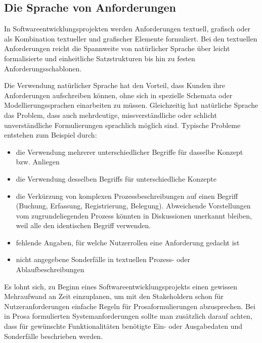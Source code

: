 \subsection{Die Sprache von Anforderungen}
\label{sec:Kap-6.2.3}

\vspace{2mm} %

In Softwareentwicklungsprojekten werden Anforderungen textuell, grafisch oder als Kombination textueller und grafischer Elemente formuliert. Bei den textuellen Anforderungen reicht die Spannweite von natürlicher Sprache über leicht formalisierte und einheitliche Satzstrukturen bis hin zu festen Anforderungsschablonen.

\vspace{2mm} %


Die Verwendung natürlicher Sprache hat den Vorteil, dass Kunden ihre Anforderungen aufschreiben können, ohne sich in spezielle Schemata oder Modellierungs\-sprachen einarbeiten zu müssen. Gleichzeitig hat natürliche Sprache das Problem, dass auch mehrdeutige, missverständliche oder schlicht unverständliche Formulierungen sprachlich möglich sind. Typische Probleme entstehen zum Beispiel durch:

\begin{itemize}
	\item die Verwendung mehrerer unterschiedlicher Begriffe für dasselbe Konzept bzw. Anliegen
	\item die Verwendung desselben Begriffs für unterschiedliche Konzepte
	\item die Verkürzung von komplexen Prozessbeschreibungen auf einen Begriff (\zb Buchung, Erfassung, Registrierung, Belegung). Abweichende Vorstellungen \linebreak %
		vom zugrundeliegenden Prozess könnten in Diskussionen unerkannt bleiben, weil alle den identischen Begriff verwenden.
	\item fehlende Angaben, für welche Nutzerrollen eine Anforderung gedacht ist
	\item nicht angegebene Sonderfälle in textuellen Prozess- oder Ablaufbeschreibungen
\end{itemize}

\vspace{2mm} %

Es lohnt sich, zu Beginn eines Softwareentwicklungsprojekts einen gewissen Mehraufwand an Zeit einzuplanen, um mit den Stakeholdern schon für Nutzeranforderungen einfache Regeln für Prosaformulierungen abzusprechen. Bei in Prosa formulierten Systemanforderungen sollte man zusätzlich darauf achten, dass für gewünschte Funktionalitäten benötigte Ein- oder Ausgabedaten und Sonderfälle beschrieben werden.

